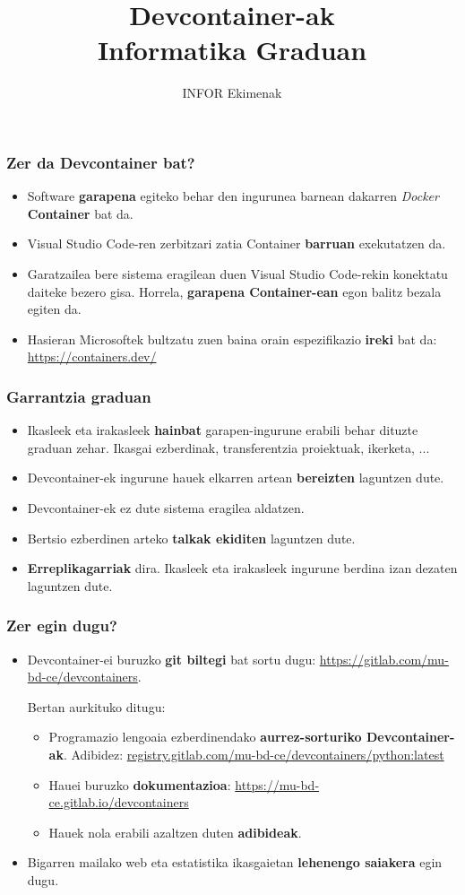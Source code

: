 \documentclass[lang=eu,biz=pls,aspectratio=169,handout]{mupresentation}
\title{Devcontainer-ak\\Informatika Graduan}
\subtitle{INFOR Ekimenak}
\institute{Mondragon Unibertsitatea}
\date{}
\begin{document}
\mucover

\begin{frame}
  \frametitle{Zer da Devcontainer bat?}
  \begin{itemize}
    \item Software \textbf{garapena} egiteko behar den ingurunea barnean dakarren \textit{Docker} \textbf{Container} bat da.
    \item Visual Studio Code-ren zerbitzari zatia Container \textbf{barruan} exekutatzen da.
    \item Garatzailea bere sistema eragilean duen Visual Studio Code-rekin konektatu daiteke bezero gisa. Horrela, \textbf{garapena Container-ean} egon balitz bezala egiten da.
    \item Hasieran Microsoftek bultzatu zuen baina orain espezifikazio \textbf{ireki} bat da:
      \url{https://containers.dev/}
  \end{itemize}
\end{frame}

\begin{frame}
  \frametitle{Garrantzia graduan}
  \begin{itemize}
    \item Ikasleek eta irakasleek \textbf{hainbat} garapen-ingurune erabili behar dituzte graduan zehar. Ikasgai ezberdinak, transferentzia proiektuak, ikerketa, ...
    \item Devcontainer-ek ingurune hauek elkarren artean \textbf{bereizten} laguntzen dute.
    \item Devcontainer-ek ez dute sistema eragilea aldatzen.
    \item Bertsio ezberdinen arteko \textbf{talkak ekiditen} laguntzen dute.
    \item \textbf{Erreplikagarriak} dira. Ikasleek eta irakasleek ingurune berdina izan dezaten laguntzen dute.
  \end{itemize}
\end{frame}

\begin{frame}
  \frametitle{Zer egin dugu?}
  \begin{itemize}
    \item Devcontainer-ei buruzko \textbf{git biltegi} bat sortu dugu:
      \url{https://gitlab.com/mu-bd-ce/devcontainers}.

      Bertan aurkituko ditugu:
      \begin{itemize}
        \item Programazio lengoaia ezberdinendako \textbf{aurrez-sorturiko Devcontainer-ak}. Adibidez:
          \url{registry.gitlab.com/mu-bd-ce/devcontainers/python:latest}
        \item Hauei buruzko \textbf{dokumentazioa}:
          \url{https://mu-bd-ce.gitlab.io/devcontainers}
        \item Hauek nola erabili azaltzen duten \textbf{adibideak}.
      \end{itemize}
    \item Bigarren mailako web eta estatistika ikasgaietan \textbf{lehenengo saiakera} egin dugu.
  \end{itemize}
\end{frame}
\end{document}
